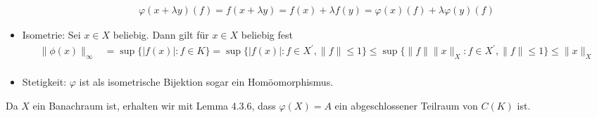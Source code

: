 \begin{solution}
\begin{itemize}
  \begin{align*}
    \varphi(x + \lambda y)(f) = f(x + \lambda y) = f(x) + \lambda f(y) = \varphi(x)(f) + \lambda \varphi(y)(f)
  \end{align*}
  \item Isometrie: Sei $x \in X$ beliebig. Dann gilt für $x \in X$ beliebig fest
  \begin{align*}
    \|\phi(x)\|_{\infty} &= \sup\{|f(x)|: f \in K\}
    = \sup\{|f(x)|: f \in X^{\prime}, \|f\| \leq 1\}
    \leq  \sup\{\|f\|\|x\|_X: f \in X^{\prime}, \|f\| \leq 1\} \leq \|x\|_X \\
  \end{align*}
  \item Stetigkeit: $\varphi$ ist als isometrische Bijektion sogar ein Homöomorphismus.
\end{itemize}
Da $X$ ein Banachraum ist, erhalten wir mit Lemma 4.3.6, dass $\varphi(X) = A$
ein abgeschlossener Teilraum von $C(K)$ ist.
\end{solution}

